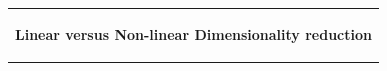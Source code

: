 %
\begin{titlepage}
  \vspace*{\fill}
  \addtolength{\hoffset}{0.5\evensidemargin-0.5\oddsidemargin} %
  \noindent%
  {\color{white}\colorbox{aaublue}{\begin{tabular}{@{}p{\textwidth}@{}}
        \begin{center}
          \Huge{\textbf{
              Linear versus Non-linear Dimensionality reduction%
            }}
        \end{center}
        \begin{center}

\end{center}
\end{tabular}}}
\end{titlepage}
